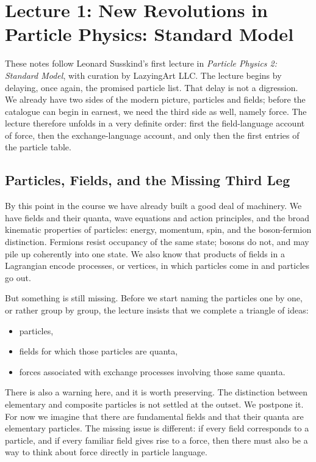 \chapter{Lecture 1: New Revolutions in Particle Physics: Standard Model}

These notes follow Leonard Susskind's first lecture in \emph{Particle Physics 2: Standard Model}, with curation by LazyingArt LLC. The lecture begins by delaying, once again, the promised particle list. That delay is not a digression. We already have two sides of the modern picture, particles and fields; before the catalogue can begin in earnest, we need the third side as well, namely force. The lecture therefore unfolds in a very definite order: first the field-language account of force, then the exchange-language account, and only then the first entries of the particle table.

\section{Particles, Fields, and the Missing Third Leg}

By this point in the course we have already built a good deal of machinery. We have fields and their quanta, wave equations and action principles, and the broad kinematic properties of particles: energy, momentum, spin, and the boson-fermion distinction. Fermions resist occupancy of the same state; bosons do not, and may pile up coherently into one state. We also know that products of fields in a Lagrangian encode processes, or vertices, in which particles come in and particles go out.

But something is still missing. Before we start naming the particles one by one, or rather group by group, the lecture insists that we complete a triangle of ideas:
\begin{itemize}
\item particles,
\item fields for which those particles are quanta,
\item forces associated with exchange processes involving those same quanta.
\end{itemize}

There is also a warning here, and it is worth preserving. The distinction between elementary and composite particles is not settled at the outset. We postpone it. For now we imagine that there are fundamental fields and that their quanta are elementary particles. The missing issue is different: if every field corresponds to a particle, and if every familiar field gives rise to a force, then there must also be a way to think about force directly in particle language.

